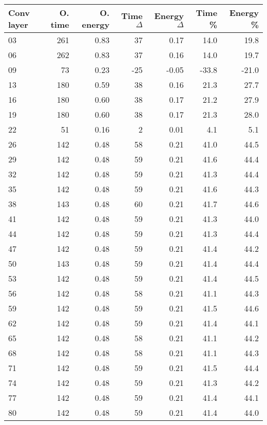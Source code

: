 \begin{table}
\centering
\begin{tabular}{|l|r|r|r|r|r|r|}
\hline
Conv layer & O. time & O. energy & Time $\Delta$ & Energy $\Delta$ & Time \% & Energy \% \\\hline
03 & 261 & 0.83 & 37 & 0.17 & 14.0 & 19.8 \\\hline
06 & 262 & 0.83 & 37 & 0.16 & 14.0 & 19.7 \\\hline
09 & 73 & 0.23 & -25 & -0.05 & -33.8 & -21.0 \\\hline
13 & 180 & 0.59 & 38 & 0.16 & 21.3 & 27.7 \\\hline
16 & 180 & 0.60 & 38 & 0.17 & 21.2 & 27.9 \\\hline
19 & 180 & 0.60 & 38 & 0.17 & 21.3 & 28.0 \\\hline
22 & 51 & 0.16 & 2 & 0.01 & 4.1 & 5.1 \\\hline
26 & 142 & 0.48 & 58 & 0.21 & 41.0 & 44.5 \\\hline
29 & 142 & 0.48 & 59 & 0.21 & 41.6 & 44.4 \\\hline
32 & 142 & 0.48 & 59 & 0.21 & 41.3 & 44.4 \\\hline
35 & 142 & 0.48 & 59 & 0.21 & 41.6 & 44.3 \\\hline
38 & 143 & 0.48 & 60 & 0.21 & 41.7 & 44.6 \\\hline
41 & 142 & 0.48 & 59 & 0.21 & 41.3 & 44.0 \\\hline
44 & 142 & 0.48 & 59 & 0.21 & 41.3 & 44.4 \\\hline
47 & 142 & 0.48 & 59 & 0.21 & 41.4 & 44.2 \\\hline
50 & 143 & 0.48 & 59 & 0.21 & 41.4 & 44.4 \\\hline
53 & 142 & 0.48 & 59 & 0.21 & 41.4 & 44.5 \\\hline
56 & 142 & 0.48 & 58 & 0.21 & 41.1 & 44.3 \\\hline
59 & 142 & 0.48 & 59 & 0.21 & 41.5 & 44.6 \\\hline
62 & 142 & 0.48 & 59 & 0.21 & 41.4 & 44.1 \\\hline
65 & 142 & 0.48 & 58 & 0.21 & 41.1 & 44.2 \\\hline
68 & 142 & 0.48 & 58 & 0.21 & 41.1 & 44.3 \\\hline
71 & 142 & 0.48 & 59 & 0.21 & 41.5 & 44.4 \\\hline
74 & 142 & 0.48 & 59 & 0.21 & 41.3 & 44.2 \\\hline
77 & 142 & 0.48 & 59 & 0.21 & 41.4 & 44.1 \\\hline
80 & 142 & 0.48 & 59 & 0.21 & 41.4 & 44.0 \\\hline

\end{tabular}
\end{table}
